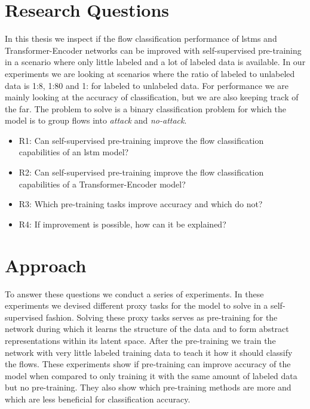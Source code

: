 \section{Research Questions} \label{sect.research_questions}

In this thesis we inspect if the flow classification performance of \glspl{lstm} and Transformer-Encoder networks can be improved with self-supervised pre-training in a scenario where only little labeled and a lot of labeled data is available. In our experiments we are looking at scenarios where the ratio of labeled to unlabeled data is 1:8, 1:80 and 1: for labeled to unlabeled data. For performance we are mainly looking at the accuracy of classification, but we are also keeping track of the \gls{far}. The problem to solve is a binary classification problem for which the model is to group flows into \textit{attack} and \textit{no-attack}. 

\begin{itemize}
	\item R1: Can self-supervised pre-training improve the flow classification capabilities of an \gls{lstm} model?
	\item R2: Can self-supervised pre-training improve the flow classification capabilities of a Transformer-Encoder model?
	\item R3: Which pre-training tasks improve accuracy and which do not?
	\item R4: If improvement is possible, how can it be explained?
\end{itemize}


\section{Approach} \label{sect.approach}

To answer these questions we conduct a series of experiments. In these experiments we devised different proxy tasks for the model to solve in a self-supervised fashion. Solving these proxy tasks serves as pre-training for the network during which it learns the structure of the data and to form abstract representations within its latent space. After the pre-training we train the network with very little labeled training data to teach it how it should classify the flows. These experiments show if pre-training can improve accuracy of the model when compared to only training it with the same amount of labeled data but no pre-training. They also show which pre-training methods are more and which are less beneficial for classification accuracy.

